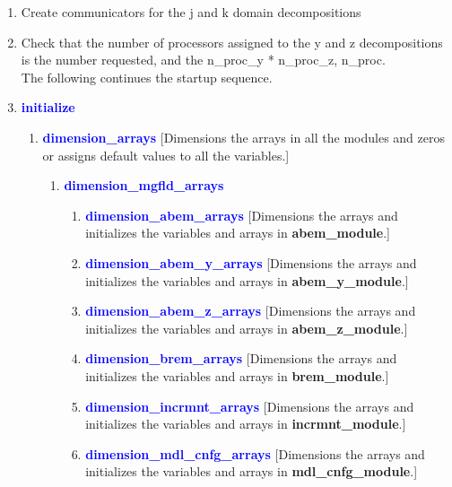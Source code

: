 \documentclass[11pt,doublespace]{article}
\begin{document}
\begin{itemize}
\begin{enumerate}
  \item Create communicators for the j and k domain decompositions
  
  \item Check that the number of processors assigned to the y and z decompositions is the number requested, and the n\_proc\_y * n\_proc\_z, n\_proc.\\
  
 The following continues the startup sequence. 
  
  \item \textcolor{blue}{ {\bf initialize} }
  
\begin{enumerate}

  \item \textcolor{blue}{ {\bf dimension\_arrays} }
  [Dimensions the arrays in all the modules and zeros or assigns default values to all the variables.]
  
\begin{enumerate}

  \item  \textcolor{blue}{ {\bf dimension\_mgfld\_arrays} }
  
\begin{enumerate}

  \item \textcolor{blue}{ {\bf dimension\_abem\_arrays} }
  [Dimensions the arrays and initializes the variables and arrays in {\bf abem\_module}.]

  \item \textcolor{blue}{ {\bf dimension\_abem\_y\_arrays} }
  [Dimensions the arrays and initializes the variables and arrays in {\bf abem\_y\_module}.]

  \item \textcolor{blue}{ {\bf dimension\_abem\_z\_arrays} }
  [Dimensions the arrays and initializes the variables and arrays in {\bf abem\_z\_module}.]

  \item \textcolor{blue}{ {\bf dimension\_brem\_arrays} }
  [Dimensions the arrays and initializes the variables and arrays in {\bf brem\_module}.]

  \item \textcolor{blue}{ {\bf dimension\_incrmnt\_arrays} }
  [Dimensions the arrays and initializes the variables and arrays in {\bf incrmnt\_module}.]

  \item \textcolor{blue}{ {\bf dimension\_mdl\_cnfg\_arrays} }
  [Dimensions the arrays and initializes the variables and arrays in {\bf mdl\_cnfg\_module}.]


\end{enumerate}
\end{enumerate}
\end{enumerate}
\end{enumerate}
\end{itemize}
\end{document}
